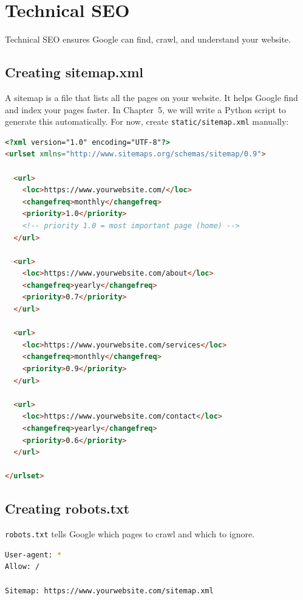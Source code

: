 \documentclass[12pt, a4paper]{book}
\begin{document}
\section{Technical SEO}

Technical SEO ensures Google can find, crawl, and understand your website.

\subsection{Creating sitemap.xml}

A sitemap is a file that lists all the pages on your website.
It helps Google find and index your pages faster.
In Chapter~5, we will write a Python script to generate this automatically.
For now, create \texttt{static/sitemap.xml} manually:

\begin{lstlisting}[language=html, style=bashstyle, caption={sitemap.xml}]
<?xml version="1.0" encoding="UTF-8"?>
<urlset xmlns="http://www.sitemaps.org/schemas/sitemap/0.9">

  <url>
    <loc>https://www.yourwebsite.com/</loc>
    <changefreq>monthly</changefreq>
    <priority>1.0</priority>
    <!-- priority 1.0 = most important page (home) -->
  </url>

  <url>
    <loc>https://www.yourwebsite.com/about</loc>
    <changefreq>yearly</changefreq>
    <priority>0.7</priority>
  </url>

  <url>
    <loc>https://www.yourwebsite.com/services</loc>
    <changefreq>monthly</changefreq>
    <priority>0.9</priority>
  </url>

  <url>
    <loc>https://www.yourwebsite.com/contact</loc>
    <changefreq>yearly</changefreq>
    <priority>0.6</priority>
  </url>

</urlset>
\end{lstlisting}

\subsection{Creating robots.txt}

\texttt{robots.txt} tells Google which pages to crawl and which to ignore.

\begin{lstlisting}[language=bash, style=bashstyle, caption={static/robots.txt}]
User-agent: *
Allow: /

Sitemap: https://www.yourwebsite.com/sitemap.xml
\end{lstlisting}
\end{document}

